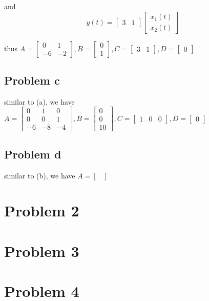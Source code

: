 \documentclass[12pt,a4paper]{article}
\begin{document}
and
\[ y(t) = \begin{bmatrix}
        3 & 1
    \end{bmatrix} \begin{bmatrix}
                      x_1(t) \\
                      x_2(t)
                  \end{bmatrix} \]

thus
$
    A =
    \begin{bmatrix}
        0  & 1  \\
        -6 & -2
    \end{bmatrix},
    B =
    \begin{bmatrix}
        0 \\
        1
    \end{bmatrix},
    C = \begin{bmatrix}
        3 & 1
    \end{bmatrix},
    D =
    \begin{bmatrix}
        0
    \end{bmatrix}
$

\subsection{Problem c}
similar to (a), we have
$
A = \begin{bmatrix}
    0  & 1 & 0  \\
    0 & 0 & 1 \\
    -6 & -8 & -4
\end{bmatrix},
B = \begin{bmatrix}
    0 \\
    0 \\
    10
\end{bmatrix},
C = \begin{bmatrix}
    1 & 0 &0
\end{bmatrix},
D = \begin{bmatrix}
    0
\end{bmatrix}
$

\subsection{Problem d}
similar to (b), we have
$
A = \begin{bmatrix}
    
\end{bmatrix}
$


\section{Problem 2}

\section{Problem 3}

\section{Problem 4}
\end{document}
